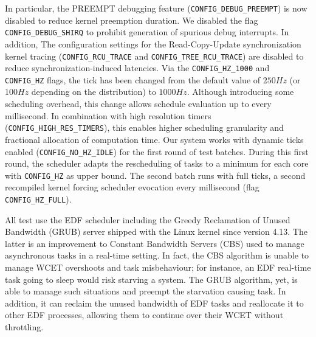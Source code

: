 \documentclass[]{scrartcl}
\begin{document}
In particular, the PREEMPT debugging feature (\texttt{CONFIG\_DEBUG\_PREEMPT}) is now disabled to reduce kernel preemption duration.
We disabled the flag \texttt{CONFIG\_DEBUG\_SHIRQ} to prohibit generation of spurious debug interrupts.
In addition, The configuration settings for the Read-Copy-Update synchronization kernel tracing  (\texttt{CONFIG\_RCU\_TRACE} and \texttt{CONFIG\_TREE\_RCU\_TRACE}) are disabled to reduce synchronization-induced latencies.
Via the \texttt{CONFIG\_HZ\_1000} and \texttt{CONFIG\_HZ} flags, the tick has been changed from the default value of $250Hz$ (or $100Hz$ depending on the distribution) to $1000Hz$.
Although introducing some scheduling overhead, this change allows schedule evaluation up to every millisecond. 
In combination with high resolution timers (\texttt{CONFIG\_HIGH\_RES\_TIMERS}), this enables higher scheduling granularity and fractional allocation of computation time.
Our system works with dynamic ticks enabled (\texttt{CONFIG\_NO\_HZ\_IDLE}) for the first round of test batches.
During this first round, the scheduler adapts the rescheduling of tasks to a minimum for each core with \texttt{CONFIG\_HZ} as upper bound. 
The second batch runs with full ticks, a second recompiled kernel forcing scheduler evocation every millisecond (flag \texttt{CONFIG\_HZ\_FULL}).

All test use the EDF scheduler including the Greedy Reclamation of Unused Bandwidth (GRUB) server shipped with the Linux kernel since version 4.13.
The latter is an improvement to Constant Bandwidth Servers (CBS) used to manage asynchronous tasks in a real-time setting. 
In fact, the CBS algorithm is unable to manage WCET overshoots and task misbehaviour; for instance, an EDF real-time task going to sleep would risk starving a system. 
The GRUB algorithm, yet, is able to manage such situations and preempt the starvation causing task. 
In addition, it can reclaim the unused bandwidth of EDF tasks and reallocate it to other EDF processes, allowing them to continue over their WCET without throttling.
\end{document}
